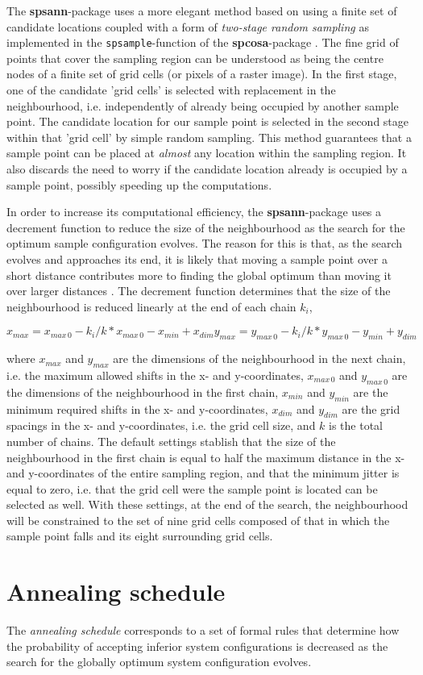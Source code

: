 The \textbf{spsann}-package uses a more elegant method based on using a finite
set of candidate locations coupled with a form of \textit{two-stage random 
sampling} as implemented in the \texttt{spsample}-function of the 
\textbf{spcosa}-package \citep{WalvoortEtAl2010}. The fine grid of points that 
cover the sampling region can be understood as being the centre nodes of a 
finite set of grid cells (or pixels of a raster image). In the first stage, one 
of the candidate 'grid cells' is selected with replacement in the neighbourhood,
i.e. independently of already being occupied by another sample point. The 
candidate location for our sample point is selected in the second stage within 
that 'grid cell' by simple random sampling. This method guarantees that a sample
 point can be placed at \textit{almost} any location within the sampling region.
It also discards the need to worry if the candidate location already is occupied
by a sample point, possibly speeding up the computations.

In order to increase its computational efficiency, the \textbf{spsann}-package 
uses a decrement function to reduce the size of the neighbourhood as the search
for the optimum sample configuration evolves. The reason for this is that, as 
the search evolves and approaches its end, it is likely that moving a sample 
point over a short distance contributes more to finding the global optimum than 
moving it over larger distances \citep{GroenigenEtAl1998}. The decrement 
function determines that the size of the neighbourhood is reduced linearly at 
the end of each chain $k_i$,

\begin{equation}
  x_{max} = x_{max\,0} - k_i / k * x_{max\,0} - x_{min} + x_{dim}

  y_{max} = y_{max\,0} - k_i / k * y_{max\,0} - y_{min} + y_{dim}
\end{equation}

where $x_{max}$ and $y_{max}$ are the dimensions of the neighbourhood in the 
next chain, i.e. the maximum allowed shifts in the x- and y-coordinates, 
$x_{max\,0}$ and $y_{max\,0}$ are the dimensions of the neighbourhood in the 
first chain, $x_{min}$ and $y_{min}$ are the minimum required shifts in the x- 
and y-coordinates, $x_{dim}$ and $y_{dim}$ are the grid spacings in the x- and 
y-coordinates, i.e. the grid cell size, and $k$ is the total number of chains.
The default settings stablish that the size of the neighbourhood in the first
chain is equal to half the maximum distance in the x- and y-coordinates of the
entire sampling region, and that the minimum jitter is equal to zero, i.e. that
the grid cell were the sample point is located can be selected as well. With 
these settings, at the end of the search, the neighbourhood will be constrained 
to the set of nine grid cells composed of that in which the sample point falls
and its eight surrounding grid cells.

\section{Annealing schedule}

The \textit{annealing schedule} corresponds to a set of formal rules that 
determine how the probability of accepting inferior system configurations is 
decreased as the search for the globally optimum system configuration evolves.

